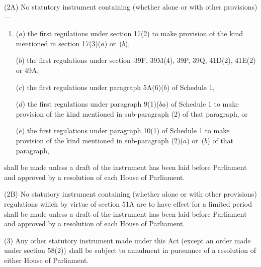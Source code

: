\documentclass[12pt,a4paper]{article}
\begin{document}

(2A) No statutory instrument containing (whether alone or with other provisions)—
\begin{enumerate}\item[]
($a$) the first regulations under section 17(2) to make provision of the kind mentioned in section 17(3)($a$) or~($b$),

($b$) the first regulations under section~39F, 39M(4), 39P, 39Q, 41D(2), 41E(2) or 49A,

($c$) the first regulations under paragraph 5A(6)($b$) of Schedule 1,

($d$) the first regulations under paragraph 9(1)($ba$) of Schedule 1 to make provision of the kind mentioned in sub-paragraph (2) of that paragraph, or

($e$) the first regulations under paragraph 10(1) of Schedule 1 to make provision of the kind mentioned in sub-paragraph (2)($a$) or~($b$) of that paragraph,
\end{enumerate}
shall be made unless a draft of the instrument has been laid before Parliament and approved by a resolution of each House of Parliament.

(2B) No statutory instrument containing (whether alone or with other provisions) regulations which by virtue of section 51A are to have effect for a limited period shall be made unless a draft of the instrument has been laid before Parliament and approved by a resolution of each House of Parliament.

(3) Any other statutory instrument made under this Act (except an order made under section 58(2)) shall be subject to annulment in pursuance of a resolution of either House of Parliament.
\end{document}
